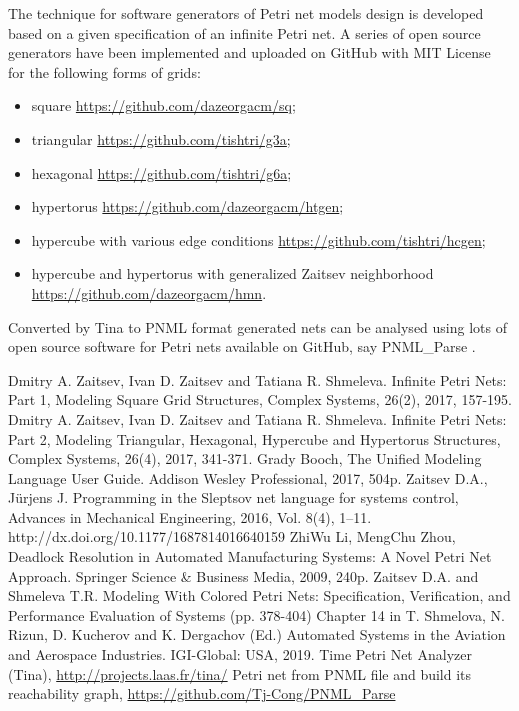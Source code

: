 \documentclass[10pt, a5paper]{article}
\begin{document}
The technique for software generators of Petri net models design is developed based on a given specification of an infinite Petri net. A series of open source generators have been implemented and uploaded on GitHub with MIT License for the following forms of grids:

\begin{itemize}
  \item square \url{https://github.com/dazeorgacm/sq};
  \item triangular \url{https://github.com/tishtri/g3a};
  \item hexagonal \url{https://github.com/tishtri/g6a};
  \item hypertorus \url{https://github.com/dazeorgacm/htgen};
  \item hypercube with various edge conditions \url{https://github.com/tishtri/hcgen};
  \item hypercube and hypertorus with generalized Zaitsev neighborhood \url{https://github.com/dazeorgacm/hmn}.
\end{itemize}

Converted by Tina \cite{bib7} to PNML format generated nets can be analysed using lots of open source software for Petri nets available on GitHub, say PNML\_Parse \cite{bib8}.

\begin{thebibliography}{9}
 {Dmitry A. Zaitsev, Ivan D. Zaitsev and Tatiana R. Shmeleva. Infinite Petri Nets: Part 1, Modeling Square Grid Structures, Complex Systems, 26(2), 2017, 157-195.}
 {Dmitry A. Zaitsev, Ivan D. Zaitsev and Tatiana R. Shmeleva. Infinite Petri Nets: Part 2, Modeling Triangular, Hexagonal, Hypercube and Hypertorus Structures, Complex Systems, 26(4), 2017, 341-371.}
 {Grady Booch, The Unified Modeling Language User Guide. Addison Wesley Professional, 2017, 504p.}
 {Zaitsev D.A., Jürjens J. Programming in the Sleptsov net language for systems control, Advances in Mechanical Engineering, 2016, Vol. 8(4), 1–11. http://dx.doi.org/10.1177/1687814016640159}
 {ZhiWu Li, MengChu Zhou, Deadlock Resolution in Automated Manufacturing Systems: A Novel Petri Net Approach. Springer Science \& Business Media, 2009, 240p.}
 {Zaitsev D.A. and Shmeleva T.R. Modeling With Colored Petri Nets: Specification, Verification, and Performance Evaluation of Systems (pp. 378-404) Chapter 14 in T. Shmelova, N. Rizun, D. Kucherov and K. Dergachov (Ed.) Automated Systems in the Aviation and Aerospace Industries. IGI-Global: USA, 2019.}
 {Time Petri Net Analyzer (Tina), \url{http://projects.laas.fr/tina/}}
 {Petri net from PNML file and build its reachability graph, \url{https://github.com/Tj-Cong/PNML_Parse}}
\end{thebibliography}
\end{document}
